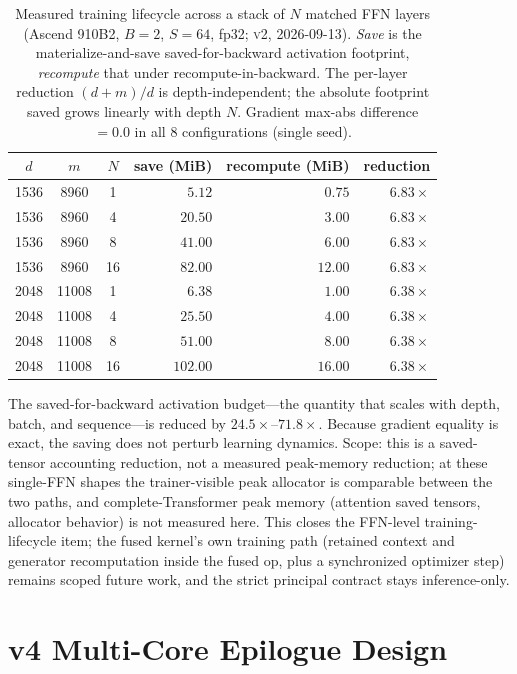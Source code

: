 \begin{table}[h]
\centering
\footnotesize
\caption{Measured training lifecycle across a stack of $N$ matched FFN layers
(Ascend 910B2, $B{=}2$, $S{=}64$, fp32; \textsc{v2}, 2026-09-13).
\emph{Save} is the materialize-and-save saved-for-backward activation
footprint, \emph{recompute} that under recompute-in-backward.  The per-layer
reduction $(d{+}m)/d$ is depth-independent; the absolute footprint saved
grows linearly with depth $N$.  Gradient max-abs difference $=0.0$ in all 8
configurations (single seed).}
\label{tab:lifecycle-depth}
\begin{tabular}{cccrrr}
\toprule
$d$ & $m$ & $N$ & save (MiB) & recompute (MiB) & reduction \\
\midrule
1536 & 8960 & 1 & $5.12$ & $0.75$ & $6.83\times$ \\
1536 & 8960 & 4 & $20.50$ & $3.00$ & $6.83\times$ \\
1536 & 8960 & 8 & $41.00$ & $6.00$ & $6.83\times$ \\
1536 & 8960 & 16 & $82.00$ & $12.00$ & $6.83\times$ \\
2048 & 11008 & 1 & $6.38$ & $1.00$ & $6.38\times$ \\
2048 & 11008 & 4 & $25.50$ & $4.00$ & $6.38\times$ \\
2048 & 11008 & 8 & $51.00$ & $8.00$ & $6.38\times$ \\
2048 & 11008 & 16 & $102.00$ & $16.00$ & $6.38\times$ \\
\bottomrule
\end{tabular}
\end{table}

The saved-for-backward activation budget---the quantity that scales with
depth, batch, and sequence---is reduced by $24.5\times$--$71.8\times$.
Because gradient equality is exact, the saving does not perturb learning
dynamics.  Scope: this is a saved-tensor accounting reduction, not a measured
peak-memory reduction; at these single-FFN shapes the trainer-visible peak
allocator is comparable between the two paths, and complete-Transformer peak
memory (attention saved tensors, allocator behavior) is not measured here.  This closes the
FFN-level training-lifecycle item; the fused kernel's own training path
(retained context and generator recomputation inside the fused op, plus a
synchronized optimizer step) remains scoped future work, and the strict
principal contract stays inference-only.

\section{v4 Multi-Core Epilogue Design}
\label{app:v4design}

